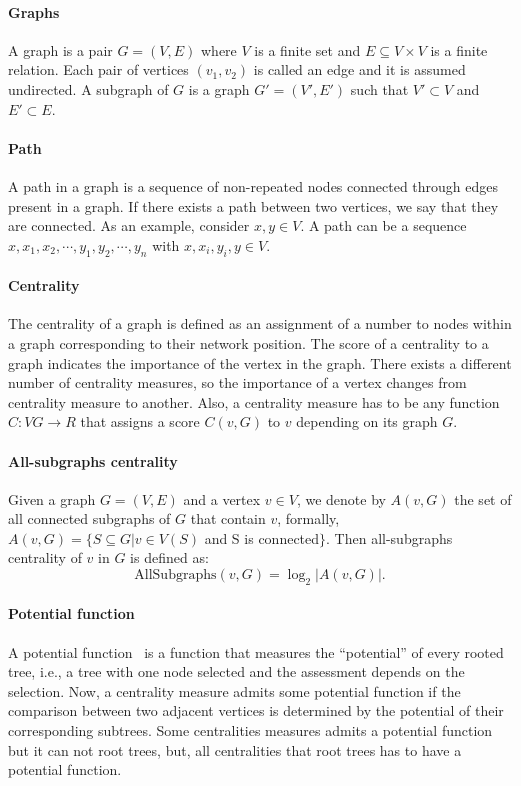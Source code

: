 

\paragraph{Graphs} A graph is a pair $G = (V, E)$ where $V$ is a finite set and $E \subseteq V\times V$ is a finite relation. Each pair of vertices $(v_{1},v_{2})$ is called an edge and it is assumed undirected. A subgraph of $G$ is a graph $G'=(V', E')$ such that $V' \subset V$ and $E' \subset E$.

\paragraph{Path} A path in a graph is a sequence of non-repeated nodes connected through edges present in a graph. If there exists a path between two vertices, we say that they are connected. As an example, consider $x,y \in V$. A path can be a sequence $x,x_{1},x_{2},\cdots,y_{1},y_{2},\cdots,y_{n}$ with $x,x_{i},y_{i},y \in V$.


\paragraph{Centrality} The centrality of a graph is defined as an assignment of a number to nodes within a graph corresponding to their network position. The score of a centrality to a graph indicates the importance of the vertex in the graph. There exists a different number of centrality measures, so the importance of a vertex changes from centrality measure to another. Also, a centrality measure has to be any function $C : VG \rightarrow R$ that assigns a score $C(v, G)$ to $v$ depending on its graph $G$. 

\paragraph{All-subgraphs centrality} Given a graph $G = (V, E)$ and a vertex $v \in V$, we denote by $A(v, G)$ the set of all connected subgraphs of $G$ that contain $v$, formally, $A(v, G) = \{S \subseteq G | v \in V (S)$ and S is connected$\}$\cite{RiverosS20}. Then all-subgraphs centrality of $v$ in $G$ is defined
as: 
$$
\text{AllSubgraphs}(v, G) = \log_{2}{|A(v, G)|}.
$$

\paragraph{Potential function} A potential function~\cite{RiverosSS23} is a function that measures the “potential” of every rooted tree, i.e.,
a tree with one node selected and the assessment depends on the selection. Now, a centrality measure admits some potential function if the comparison between two adjacent vertices is determined by the potential of their corresponding subtrees. Some centralities measures admits a potential function but it can not root trees, but, all centralities that root trees has to have a potential function.

